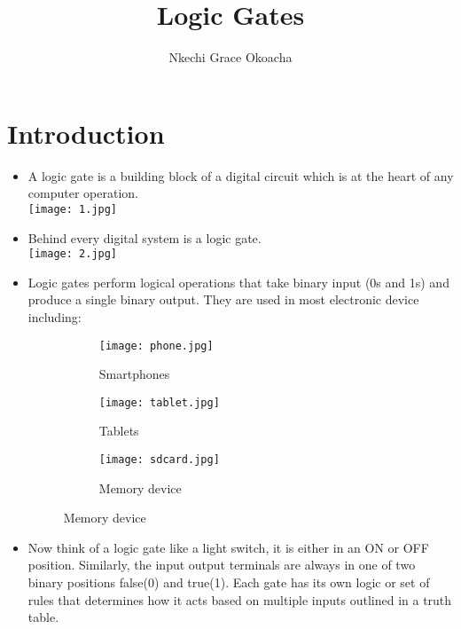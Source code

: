 \documentclass[10pt,a4paper,onecolumn]{article}
\begin{document}
	\title{Logic Gates}
	\author{Nkechi Grace Okoacha}
	\maketitle
\tableofcontents
	
\newpage
\section{Introduction}
\label{intro}
	\begin{itemize}
		\item A logic gate is a building block of a digital circuit which is at the heart of any computer operation. \\
		
\texttt{[image: 1.jpg]}
		
		\item Behind every digital system is a logic gate. \\
		
		\texttt{[image: 2.jpg]}
		
		\item Logic gates perform logical operations that take binary input (0s and 1s) and produce  a single binary output. They are used in most electronic device including: \\
			\begin{figure}[h!]
				\centering
				\begin{subfigure}[b]{0.35\linewidth}
				\texttt{[image: phone.jpg]}
				\caption{Smartphones}
				\end{subfigure}
			\begin{subfigure}[b]{0.35\linewidth}
				\texttt{[image: tablet.jpg]}
				\caption{Tablets}
			\end{subfigure}
		\begin{subfigure}[b]{0.35\linewidth}
			\texttt{[image: sdcard.jpg]}
			\caption{Memory device}
		\end{subfigure}
			\end{figure} 
		
		\item Now think of a logic gate like a light switch, it is either in an ON or OFF position. Similarly, the input output terminals are always in one of two binary positions false(0) and true(1). Each gate has its own logic or set of rules that determines how it acts based on multiple inputs outlined in a truth table. \\
		

\end{itemize}
\end{document}
